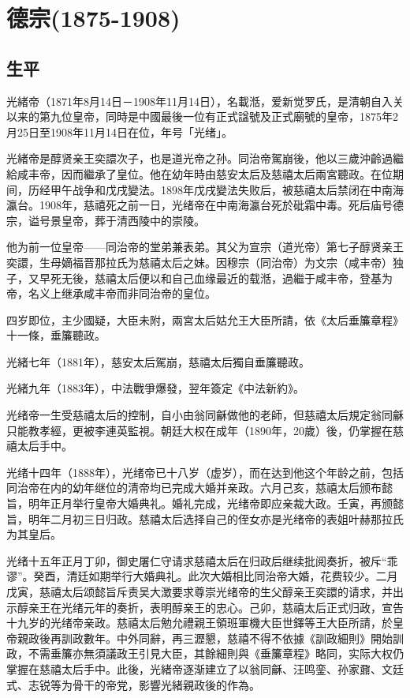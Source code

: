 
\section{德宗\tiny(1875-1908)}

\subsection{生平}

光緒帝（1871年8月14日－1908年11月14日），名載湉，爱新觉罗氏，是清朝自入关以来的第九位皇帝，同時是中國最後一位有正式諡號及正式廟號的皇帝，1875年2月25日至1908年11月14日在位，年号「光绪」。

光緒帝是醇贤亲王奕譞次子，也是道光帝之孙。同治帝駕崩後，他以三歲沖齡過繼給咸丰帝，因而繼承了皇位。他在幼年時由慈安太后及慈禧太后兩宮聽政。在位期间，历经甲午战争和戊戌變法。1898年戊戌變法失败后，被慈禧太后禁闭在中南海瀛台。1908年，慈禧死之前一日，光绪帝在中南海瀛台死於砒霜中毒。死后庙号德宗，谥号景皇帝，葬于清西陵中的崇陵。

他为前一位皇帝——同治帝的堂弟兼表弟。其父为宣宗（道光帝）第七子醇贤亲王奕譞，生母嫡福晋那拉氏为慈禧太后之妹。因穆宗（同治帝）为文宗（咸丰帝）独子，又早死无後，慈禧太后便以和自己血缘最近的载湉，過繼于咸丰帝，登基为帝，名义上继承咸丰帝而非同治帝的皇位。


四岁即位，主少國疑，大臣未附，兩宮太后姑允王大臣所請，依《太后垂簾章程》十一條，垂簾聽政。

光緒七年（1881年），慈安太后駕崩，慈禧太后獨自垂簾聽政。

光緒九年（1883年），中法戰爭爆發，翌年簽定《中法新約》。

光绪帝一生受慈禧太后的控制，自小由翁同龢做他的老師，但慈禧太后規定翁同龢只能教孝經，更被李連英監視。朝廷大权在成年（1890年，20歲）後，仍掌握在慈禧太后手中。

光绪十四年（1888年），光绪帝已十八岁（虚岁），而在达到他这个年龄之前，包括同治帝在内的幼年继位的清帝均已完成大婚并亲政。六月己亥，慈禧太后颁布懿旨，明年正月举行皇帝大婚典礼。婚礼完成，光绪帝即应亲裁大政。壬寅，再颁懿旨，明年二月初三日归政。慈禧太后选择自己的侄女亦是光绪帝的表姐叶赫那拉氏为其皇后。

光绪十五年正月丁卯，御史屠仁守请求慈禧太后在归政后继续批阅奏折，被斥“乖谬”。癸酉，清廷如期举行大婚典礼。此次大婚相比同治帝大婚，花费较少。二月戊寅，慈禧太后颂懿旨斥责吴大澂要求尊崇光绪帝的生父醇亲王奕譞的请求，并出示醇亲王在光绪元年的奏折，表明醇亲王的忠心。己卯，慈禧太后正式归政，宣告十九岁的光绪帝亲政。慈禧太后勉允禮親王領班軍機大臣世鐸等王大臣所請，於皇帝親政後再訓政數年。中外同辭，再三瀝懇，慈禧不得不依據《訓政細則》開始訓政，不需垂簾亦無須議政王引見大臣，其餘細則與《垂簾章程》略同，实际大权仍掌握在慈禧太后手中。此後，光緒帝逐渐建立了以翁同龢、汪鸣銮、孙家鼐、文廷式、志锐等为骨干的帝党，影響光緒親政後的作為。

